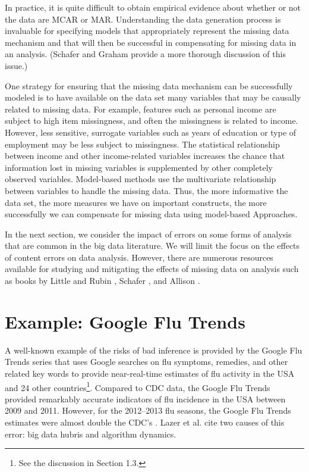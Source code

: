 \documentclass[]{krantz}
\begin{document}
In practice, it is quite difficult to obtain empirical evidence about
whether or not the data are MCAR or MAR. Understanding the data
generation process is invaluable for specifying models that
appropriately represent the missing data mechanism and that will then be
successful in compensating for missing data in an analysis. (Schafer and
Graham \citet{schafer2002missing} provide a more thorough discussion of
this issue.)

One strategy for ensuring that the missing data mechanism can be
successfully modeled is to have available on the data set many variables
that may be causally related to missing data. For example, features such
as personal income are subject to high item missingness, and often the
missingness is related to income. However, less sensitive, surrogate
variables such as years of education or type of employment may be less
subject to missingness. The statistical relationship between income and
other income-related variables increases the chance that information
lost in missing variables is supplemented by other completely observed
variables. Model-based methods use the multivariate relationship between
variables to handle the missing data. Thus, the more informative the
data set, the more measures we have on important constructs, the more
successfully we can compensate for missing data using model-based
Approaches.

In the next section, we consider the impact of errors on some forms of
analysis that are common in the big data literature. We will limit the
focus on the effects of content errors on data analysis. However, there
are numerous resources available for studying and mitigating the effects
of missing data on analysis such as books by Little and Rubin
\citeyearpar{little2014statistical}, Schafer
\citeyearpar{schafer1997analysis}, and Allison
\citeyearpar{allison2001missing}.

\section{Example: Google Flu Trends}\label{sec:10-3}

A well-known example of the risks of bad inference is provided by the
Google Flu Trends series that uses Google searches on flu symptoms,
remedies, and other related key words to provide near-real-time
estimates of flu activity in the USA and 24 other countries\footnote{See
  the discussion in Section 1.3.}. Compared to CDC data, the Google Flu
Trends provided remarkably accurate indicators of flu incidence in the
USA between 2009 and 2011. However, for the 2012--2013 flu seasons, the
Google Flu Trends estimates were almost double the CDC's
\citep{butler2013google}. Lazer et al. \citeyearpar{lazer2014parable}
cite two causes of this error: big data hubris and algorithm dynamics.
\end{document}
